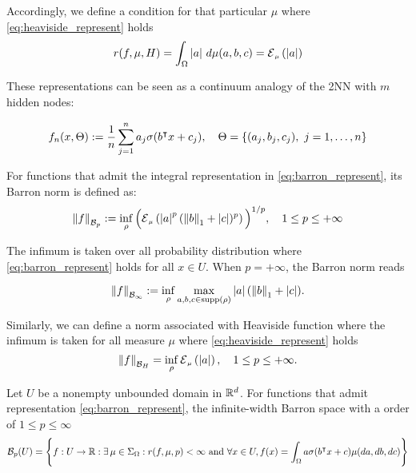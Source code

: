 Accordingly, we define a condition for that particular $\mu$ where
\eqref{eq:heaviside_represent} holds
\begin{align}
    r(f,\mu, H)
    = \int_{\Omega} \abs{a}\,d\mu(a,b,c) = \ERWi{\mu}{\abs{a}}
\end{align}

These representations can be seen as a continuum analogy of the 2NN with $m$
hidden nodes:

\begin{equation}
    f_n(x, \Theta) := \frac{1}{n}
    \sum_{j=1}^n a_j 
        \sigma(b{}^{\intercal} x + c_j), 
    \quad \Theta = \{(a_j, b_j, c_j), \ j = 1, \dots, n\}
\end{equation}

\begin{definition} For functions that admit the integral
    representation in \eqref{eq:barron_represent}, its Barron norm is defined as:
    \begin{equation}\label{eq:barron_norm}
        \barronnorm{f}{p} := \inf_{\rho} \Big(\ERWi{\mu}{\abs{a}^p 
        (\norm{b}_1 + \abs{c})^p}\Big)^{1/p},
        \quad 1 \leq p \leq +\infty
    \end{equation}
\end{definition}

The infimum is taken over all probability distribution where
\eqref{eq:barron_represent} holds for all $x \in U$. When $p = + \infty$, the
Barron norm reads

\begin{equation}
    \label{eq:barron_infinite_norm}
    \left\| {f} \right\|_{\mathcal{B}_{\infty}} :=
    \inf_{\rho} \max_{a, b, c \in \operatorname{supp}(\rho)} \left| a \right| (\left\| b \right\|_1 + \left| c \right|).
\end{equation}

Similarly, we can define a norm associated with Heaviside function where the
infimum is taken for all measure $\mu$ where \eqref{eq:heaviside_represent}
holds
\begin{equation}
    \label{def:heaviside_norm}
    \norm{f}_{\mcal{B}_H} = \inf_{\rho} \ERWi{\mu}{\abs{a}},
    \quad 1 \leq p \leq +\infty.
\end{equation}

\begin{definition}
    \label{def:barron_space}
    Let $U$ be a nonempty unbounded domain in $\mathbb{R}^d$. For functions that admit
    representation \eqref{eq:barron_represent}, the infinite-width Barron space
    with a order of $1 \leq p \leq \infty$
    \begin{equation}
        \mathcal{B}_p(U) = \Bigg\{
            f: U \to \mathbb{R} : \exists\, \mu \in \Sigma_{\Omega}: 
            r(f, \mu, p) < \infty \textnormal{ and }
            \forall x \in U, f(x) = \int_{\Omega} a \sigma(b{}^{\intercal} x + c) \mu(da, db, dc)
        \Bigg\}
    \end{equation}
\end{definition}

